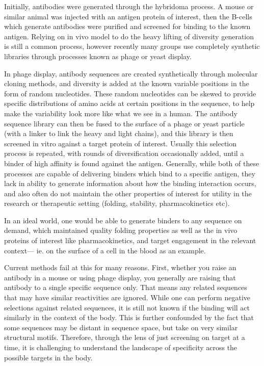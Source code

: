 Initially, antibodies were generated through the hybridoma process\cite{Kohler1975-oz}. A mouse or similar animal was injected with an antigen protein of interest, then the B-cells which generate antibodies were purified and screened for binding to the known antigen. Relying on in vivo model to do the heavy lifting of diversity generation is still a common process, however recently many groups use completely synthetic libraries through processes known as phage or yeast display\cite{McCafferty1990-wl,Boder1997-gx}.

In phage display, antibody sequences are created synthetically through molecular cloning methods, and diversity is added at the known variable positions in the form of random nucleotides\cite{McCafferty1990-wl,Clackson1991-aj}. These random nucleotides can be skewed to provide specific distributions of amino acids at certain positions in the sequence, to help make the variability look more like what we see in a human\cite{Hoet2005-qp}. The antibody sequence library can then be fused to the surface of a phage or yeast particle (with a linker to link the heavy and light chains), and this library is then screened in vitro against a target protein of interest. Usually this selection process is repeated, with rounds of diversification occasionally added, until a binder of high affinity is found against the antigen. Generally, while both of these processes are capable of delivering binders which bind to a specific antigen, they lack in ability to generate information about how the binding interaction occurs, and also often do not maintain the other properties of interest for utility in the research or therapeutic setting (folding, stability, pharmacokinetics etc). 

In an ideal world, one would be able to generate binders to any sequence on demand, which maintained quality folding properties as well as the in vivo proteins of interest like pharmacokinetics, and target engagement in the relevant context--- ie. on the surface of a cell in the blood as an example. 

Current methods fail at this for many reasons. First, whether you raise an antibody in a mouse or using phage display, you generally are raising that antibody to a single specific sequence only. That means any related sequences that may have similar reactivities are ignored. While one can perform negative selections against related sequences, it is still not known if the binding will act similarly in the context of the body. This is further confounded by the fact that some sequences may be distant in sequence space, but take on very similar structural motifs. Therefore, through the lens of just screening on target at a time, it is challenging to understand the landscape of specificity across the possible targets in the body. 

